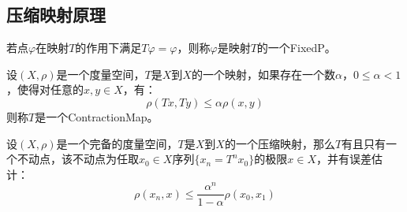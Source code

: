 \subsection{压缩映射原理}
\begin{definition}
	若点$\varphi$在映射$T$的作用下满足$T\varphi=\varphi$，则称$\varphi$是映射$T$的一个\gls{FixedP}。
\end{definition}
\begin{definition}
	设$(X,\rho)$是一个度量空间，$T$是$X$到$X$的一个映射，如果存在一个数$\alpha$，$0\leqslant\alpha<1$，使得对任意的$x,y\in X$，有：
	\begin{equation*}
		\rho(Tx,Ty)\leqslant\alpha\rho(x,y)
	\end{equation*}
	则称$T$是一个\gls{ContractionMap}。
\end{definition}
\begin{theorem}\label{theo:ContractionMapTheorem}
	设$(X,\rho)$是一个完备的度量空间，$T$是$X$到$X$的一个压缩映射，那么$T$有且只有一个不动点，该不动点为任取$x_0\in X$序列$\{x_n=T^nx_0\}$的极限$x\in X$，并有误差估计：
	\begin{equation*}
		\rho(x_n,x)\leqslant\frac{\alpha^n}{1-\alpha}\rho(x_0,x_1)
	\end{equation*}
\end{theorem}
